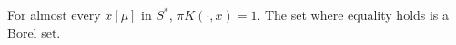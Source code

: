 For almost every $x [\mu]$ in $S^*$, $\pi K(\cdot, x) = 1$. The set where equality holds is a Borel set.
